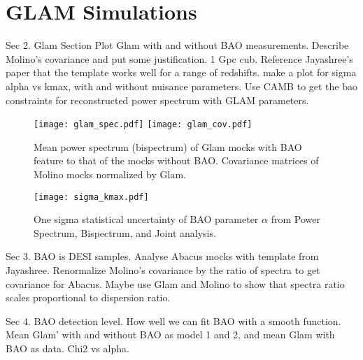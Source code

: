 \section{GLAM Simulations}\label{sec:glam}

Sec 2. Glam Section
Plot Glam with and without BAO measurements.
Describe Molino's covariance and put some justification. 1 Gpc cub.
Reference Jayashree's paper that the template works well for a range of redshifts. make a plot for sigma alpha vs kmax, with and without nuisance parameters.
Use CAMB to get the bao constraints for reconstructed power spectrum with GLAM parameters.

\begin{figure*}
\centering
\texttt{[image: glam\_spec.pdf]}
\texttt{[image: glam\_cov.pdf]}
\caption{Mean power spectrum (bispectrum) of Glam mocks with BAO feature to that of the  mocks without BAO. Covariance matrices of Molino mocks normalized by Glam.}
\end{figure*}



\begin{figure}
\centering
\texttt{[image: sigma\_kmax.pdf]}
\caption{One sigma statistical uncertainty of BAO parameter $\alpha$ from Power Spectrum, Bispectrum, and Joint analysis.}
\end{figure}

Sec 3. BAO is DESI samples. Analyse Abacus mocks with template from Jayashree. Renormalize Molino's covariance by the ratio of spectra to get covariance for Abacus. Maybe use Glam and Molino to show that spectra ratio scales proportional to dispersion ratio.

Sec 4. BAO detection level. How well we can fit BAO with a smooth function. Mean Glam' with and without BAO as model 1 and 2, and mean Glam with BAO as data. Chi2 vs alpha.
